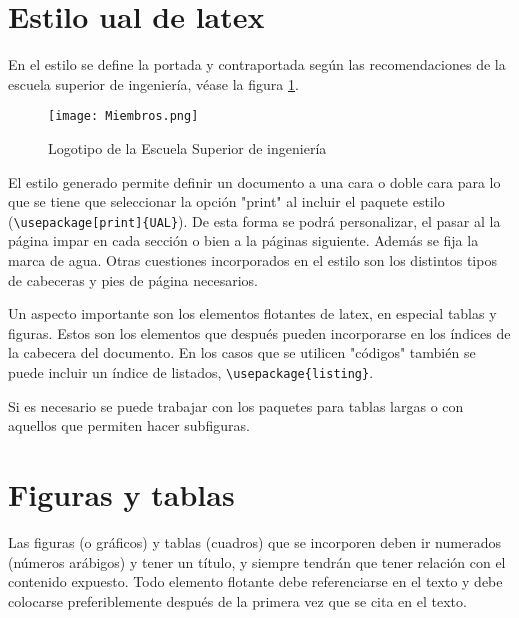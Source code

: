 \section {Estilo ual de latex}

En el estilo se define la portada y contraportada según las recomendaciones de la escuela superior de ingeniería, véase la figura \ref{fig:facultad}.

\begin{figure}
	\begin{center}
		\texttt{[image: Miembros.png]}
	\end{center}
	\caption{\label{fig:facultad} Logotipo de la Escuela Superior de ingeniería }
\end{figure}



El estilo generado permite definir un documento a una cara o doble cara para lo que se tiene que seleccionar la opción "print" al incluir el paquete estilo (\lstinline[language=enparrafo]!\usepackage[print]{UAL}!). De esta forma se podrá personalizar, el pasar al la página impar en cada sección o bien a la páginas siguiente. %
Además se fija la marca de agua. Otras cuestiones incorporados en el estilo son los distintos tipos de cabeceras y pies de página necesarios.

Un aspecto importante son los elementos flotantes de latex, en especial tablas y figuras. Estos son los elementos que después pueden incorporarse en los índices de la cabecera del documento. En los casos que se utilicen "códigos" también se puede incluir un índice de listados, \lstinline[language=enparrafo]!\usepackage{listing}!.

Si es necesario se puede trabajar con los paquetes para tablas largas o con aquellos que permiten hacer subfiguras.

 \section{Figuras y tablas}

Las  figuras  (o  gráficos)  y  tablas  (cuadros)  que  se  incorporen  deben  ir  numerados  (números  arábigos)  y  tener  un  título,  y  siempre  tendrán  que  tener  relación  con el contenido expuesto.  Todo elemento flotante debe referenciarse en el texto y debe colocarse  preferiblemente después de la primera vez que se cita en el texto.

